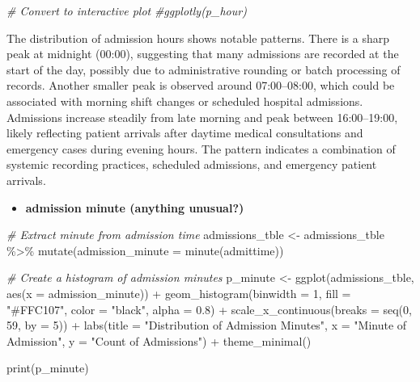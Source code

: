\documentclass[
]{article}
\newenvironment{Shaded}{\begin{snugshade}}{\end{snugshade}}
\newcommand{\AttributeTok}[1]{\textcolor[rgb]{0.77,0.63,0.00}{#1}}
\newcommand{\CommentTok}[1]{\textcolor[rgb]{0.56,0.35,0.01}{\textit{#1}}}
\newcommand{\DecValTok}[1]{\textcolor[rgb]{0.00,0.00,0.81}{#1}}
\newcommand{\FloatTok}[1]{\textcolor[rgb]{0.00,0.00,0.81}{#1}}
\newcommand{\FunctionTok}[1]{\textcolor[rgb]{0.00,0.00,0.00}{#1}}
\newcommand{\NormalTok}[1]{\textcolor[rgb]{0.00,0.00,0.00}{#1}}
\newcommand{\OtherTok}[1]{\textcolor[rgb]{0.56,0.35,0.01}{#1}}
\newcommand{\SpecialCharTok}[1]{\textcolor[rgb]{0.00,0.00,0.00}{#1}}
\newcommand{\StringTok}[1]{\textcolor[rgb]{0.31,0.60,0.02}{#1}}
\providecommand{\tightlist}{%
  \setlength{\itemsep}{0pt}\setlength{\parskip}{0pt}}\usepackage{longtable,booktabs,array}
\begin{document}
\begin{Shaded}
\begin{Highlighting}[]
\CommentTok{\# Convert to interactive plot}
\CommentTok{\#ggplotly(p\_hour)}
\end{Highlighting}
\end{Shaded}

The distribution of admission hours shows notable patterns. There is a
sharp peak at midnight (00:00), suggesting that many admissions are
recorded at the start of the day, possibly due to administrative
rounding or batch processing of records. Another smaller peak is
observed around 07:00--08:00, which could be associated with morning
shift changes or scheduled hospital admissions. Admissions increase
steadily from late morning and peak between 16:00--19:00, likely
reflecting patient arrivals after daytime medical consultations and
emergency cases during evening hours. The pattern indicates a
combination of systemic recording practices, scheduled admissions, and
emergency patient arrivals.

\begin{itemize}
\tightlist
\item
  \textbf{admission minute (anything unusual?)}
\end{itemize}

\begin{Shaded}
\begin{Highlighting}[]
\CommentTok{\# Extract minute from admission time}
\NormalTok{admissions\_tble }\OtherTok{\textless{}{-}}\NormalTok{ admissions\_tble }\SpecialCharTok{\%\textgreater{}\%}
  \FunctionTok{mutate}\NormalTok{(}\AttributeTok{admission\_minute =} \FunctionTok{minute}\NormalTok{(admittime))}

\CommentTok{\# Create a histogram of admission minutes}
\NormalTok{p\_minute }\OtherTok{\textless{}{-}} \FunctionTok{ggplot}\NormalTok{(admissions\_tble, }\FunctionTok{aes}\NormalTok{(}\AttributeTok{x =}\NormalTok{ admission\_minute)) }\SpecialCharTok{+}
  \FunctionTok{geom\_histogram}\NormalTok{(}\AttributeTok{binwidth =} \DecValTok{1}\NormalTok{, }\AttributeTok{fill =} \StringTok{"\#FFC107"}\NormalTok{, }
                 \AttributeTok{color =} \StringTok{"black"}\NormalTok{, }\AttributeTok{alpha =} \FloatTok{0.8}\NormalTok{) }\SpecialCharTok{+}
  \FunctionTok{scale\_x\_continuous}\NormalTok{(}\AttributeTok{breaks =} \FunctionTok{seq}\NormalTok{(}\DecValTok{0}\NormalTok{, }\DecValTok{59}\NormalTok{, }\AttributeTok{by =} \DecValTok{5}\NormalTok{)) }\SpecialCharTok{+}
  \FunctionTok{labs}\NormalTok{(}\AttributeTok{title =} \StringTok{"Distribution of Admission Minutes"}\NormalTok{,}
       \AttributeTok{x =} \StringTok{"Minute of Admission"}\NormalTok{,}
       \AttributeTok{y =} \StringTok{"Count of Admissions"}\NormalTok{) }\SpecialCharTok{+}
  \FunctionTok{theme\_minimal}\NormalTok{()}

\FunctionTok{print}\NormalTok{(p\_minute)}
\end{Highlighting}
\end{Shaded}
\end{document}

